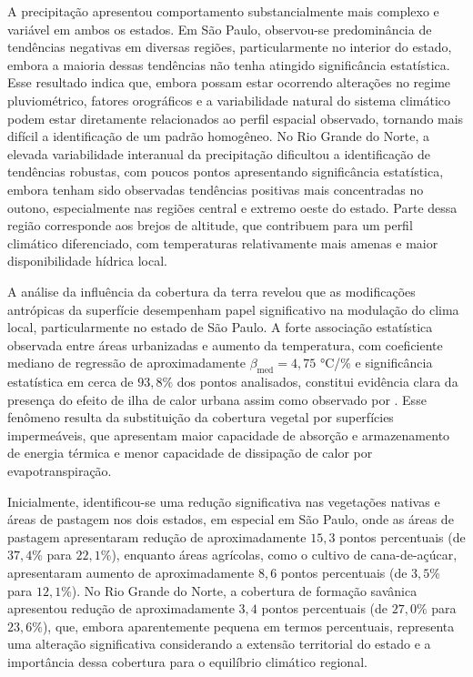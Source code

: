 A precipitação apresentou comportamento substancialmente mais complexo e variável em ambos os estados. Em São Paulo, observou-se predominância de tendências negativas em diversas regiões, particularmente no interior do estado, embora a maioria dessas tendências não tenha atingido significância estatística. Esse resultado indica que, embora possam estar ocorrendo alterações no regime pluviométrico, fatores orográficos e a variabilidade natural do sistema climático podem estar diretamente relacionados ao perfil espacial observado, tornando mais difícil a identificação de um padrão homogêneo. No Rio Grande do Norte, a elevada variabilidade interanual da precipitação dificultou a identificação de tendências robustas, com poucos pontos apresentando significância estatística, embora tenham sido observadas tendências positivas mais concentradas no outono, especialmente nas regiões central e extremo oeste do estado. Parte dessa região corresponde aos brejos de altitude, que contribuem para um perfil climático diferenciado, com temperaturas relativamente mais amenas e maior disponibilidade hídrica local.

A análise da influência da cobertura da terra revelou que as modificações antrópicas da superfície desempenham papel significativo na modulação do clima local, particularmente no estado de São Paulo. A forte associação estatística observada entre áreas urbanizadas e aumento da temperatura, com coeficiente mediano de regressão de aproximadamente $\beta_{\mathrm{med}} = 4{,}75$ °C/\% e significância estatística em cerca de $93{,}8\%$ dos pontos analisados, constitui evidência clara da presença do efeito de ilha de calor urbana assim como observado por \cite{Campelo}. Esse fenômeno resulta da substituição da cobertura vegetal por superfícies impermeáveis, que apresentam maior capacidade de absorção e armazenamento de energia térmica e menor capacidade de dissipação de calor por evapotranspiração.

Inicialmente, identificou-se uma redução significativa nas vegetações nativas e áreas de pastagem nos dois estados, em especial em São Paulo, onde as áreas de pastagem apresentaram redução de aproximadamente $15{,}3$ pontos percentuais (de $37{,}4\%$ para $22{,}1\%$), enquanto áreas agrícolas, como o cultivo de cana-de-açúcar, apresentaram aumento de aproximadamente $8{,}6$ pontos percentuais (de $3{,}5\%$ para $12{,}1\%$). No Rio Grande do Norte, a cobertura de formação savânica apresentou redução de aproximadamente $3{,}4$ pontos percentuais (de $27{,}0\%$ para $23{,}6\%$), que, embora aparentemente pequena em termos percentuais, representa uma alteração significativa considerando a extensão territorial do estado e a importância dessa cobertura para o equilíbrio climático regional.

